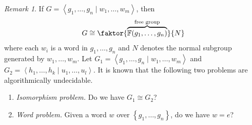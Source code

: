 \documentclass[10pt,letterpaper,cm]{nupset}
\theoremstyle{definition}
\theoremstyle{theorem}
\theoremstyle{remark}
\newtheorem{remark}[definition]{Remark}
\newcommand{\F}{\mathbb F}
\newcommand{\1}{\mathbb{1}}
\newcommand{\0}{\vec 0}
\begin{document}
\begin{remark} If $G = \left\langle g_1, \ldots, g_n \mid w_1, \ldots, w_m \right\rangle$, then $$G \cong \faktor{\overbrace{\F(g_1, \ldots, g_n)}^{\text{free group}}}{N}$$ where  each $w_i$ is a word in $g_1, \ldots, g_n$ and $N$ denotes the normal subgroup generated by $w_1, \ldots, w_m$.
Let $G_1 = \left\langle g_1, \ldots, g_n \mid w_1, \ldots, w_m \right\rangle$ and $G_2 = \left\langle h_1, \ldots, h_k \mid u_1, \ldots, u_l \right\rangle$.
It is known that the following two problems are algorithmically undecidable.
\begin{enumerate}[label=(\alph*)]
\item{\textit{Isomorphism problem.}} Do we have $G_1 \cong G_2$?
\item {\textit{Word problem.}} Given a word $w$ over $\left\{g_1, \ldots, g_n\right\}$, do we have $w=e$? 
\end{enumerate}
\end{remark}

\bigskip
\end{document}
